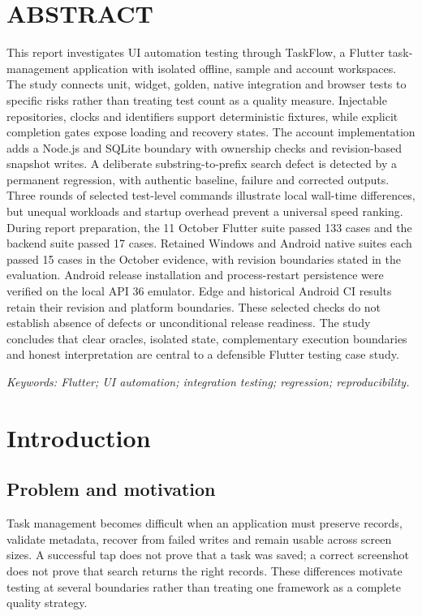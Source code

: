 \documentclass[12pt,a4paper,oneside]{report}
\begin{document}
\hypersetup{pageanchor=true}\chapter*{ABSTRACT}
This report investigates UI automation testing through TaskFlow, a Flutter task-management application with isolated offline, sample and account workspaces. The study connects unit, widget, golden, native integration and browser tests to specific risks rather than treating test count as a quality measure. Injectable repositories, clocks and identifiers support deterministic fixtures, while explicit completion gates expose loading and recovery states. The account implementation adds a Node.js and SQLite boundary with ownership checks and revision-based snapshot writes. A deliberate substring-to-prefix search defect is detected by a permanent regression, with authentic baseline, failure and corrected outputs. Three rounds of selected test-level commands illustrate local wall-time differences, but unequal workloads and startup overhead prevent a universal speed ranking. During report preparation, the 11 October Flutter suite passed 133 cases and the backend suite passed 17 cases. Retained Windows and Android native suites each passed 15 cases in the October evidence, with revision boundaries stated in the evaluation. Android release installation and process-restart persistence were verified on the local API 36 emulator. Edge and historical Android CI results retain their revision and platform boundaries. These selected checks do not establish absence of defects or unconditional release readiness. The study concludes that clear oracles, isolated state, complementary execution boundaries and honest interpretation are central to a defensible Flutter testing case study.


\noindent\textit{Keywords: Flutter; UI automation; integration testing; regression; reproducibility.}
\tableofcontents\clearpage\listoffigures\listoftables\clearpage{}
\chapter{Introduction}
\section{Problem and motivation}
Task management becomes difficult when an application must preserve records, validate metadata, recover from failed writes and remain usable across screen sizes. A successful tap does not prove that a task was saved; a correct screenshot does not prove that search returns the right records. These differences motivate testing at several boundaries rather than treating one framework as a complete quality strategy.
\end{document}
